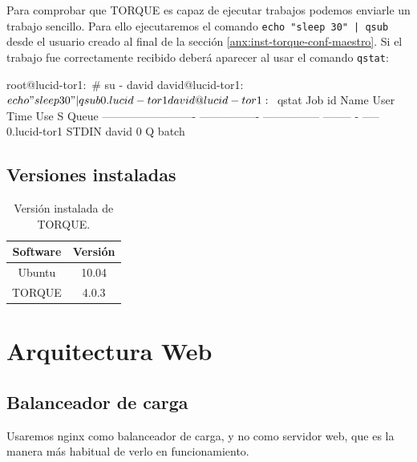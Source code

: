 Para comprobar que TORQUE es capaz de ejecutar trabajos podemos enviarle un trabajo sencillo. Para ello ejecutaremos el comando \texttt{echo "sleep 30" | qsub} desde el usuario creado al final de la sección \ref{anx:inst-torque-conf-maestro}. Si el trabajo fue correctamente recibido deberá aparecer al usar el comando \texttt{qstat}:

\begin{bashcode}
root@lucid-tor1:~# su - david
david@lucid-tor1:~$ echo "sleep 30" | qsub
0.lucid-tor1
david@lucid-tor1:~$ qstat
Job id                    Name             User            Time Use S Queue
------------------------- ---------------- --------------- -------- - -----
0.lucid-tor1              STDIN            david                  0 Q batch
\end{bashcode}


\subsection{Versiones instaladas}

\begin{table}[!htbp]
\centering
   \begin{tabular}{|c|c|}
      \hline
      \textbf{Software} & \textbf{Versión} \\ \hline
      Ubuntu & 10.04 \\ \hline
      TORQUE & 4.0.3 \\ \hline
   \end{tabular}
\caption{Versión instalada de TORQUE.}
\label{table:torque-versions}
\end{table}


\section{Arquitectura Web}
\label{anx:inst-web}


\subsection{Balanceador de carga}


Usaremos nginx como balanceador de carga, y no como servidor web, que es la manera más habitual de verlo en funcionamiento.


